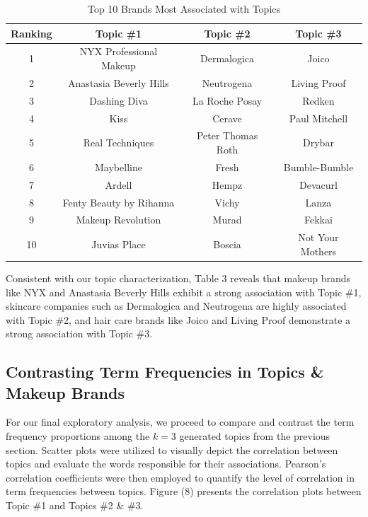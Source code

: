 \documentclass[10pt]{article}
\begin{document}
\begin{table}[h!]
    \centering
    \begin{tabular}{| c | c | c | c |} 
    \hline
    \textbf{Ranking} & \textbf{Topic \#1} & \textbf{Topic \#2} &  \textbf{Topic \#3}\\ 
    \hline
    \hline
     1  & NYX Professional Makeup & Dermalogica & Joico \\
     \hline  
     2  & Anastasia Beverly Hills & Neutrogena & Living Proof \\
     \hline  
     3  & Dashing Diva & La Roche Posay & Redken \\
     \hline  
     4  & Kiss & Cerave & Paul Mitchell \\
     \hline  
     5  & Real Techniques &	Peter Thomas Roth &	Drybar \\
     \hline  
     6  & Maybelline & Fresh & Bumble-Bumble \\ 
     \hline  
     7  & Ardell & Hempz & Devacurl \\
     \hline  
     8  & Fenty Beauty by Rihanna & Vichy & Lanza \\
     \hline  
     9  & Makeup Revolution & Murad & Fekkai \\
     \hline  
     10 & Juvias Place & Boscia & Not Your Mothers \\
    \hline  
    \end{tabular}
    \caption{Top 10 Brands Most Associated with Topics}
\end{table}

Consistent with our topic characterization, Table 3 reveals that makeup brands like NYX and Anastasia Beverly Hills exhibit a strong association with Topic \#1, skincare companies such as Dermalogica and Neutrogena are highly associated with Topic \#2, and hair care brands like Joico and Living Proof demonstrate a strong association with Topic \#3.


\subsection{Contrasting Term Frequencies in Topics \& Makeup Brands}

For our final exploratory analysis, we proceed to compare and contrast the term frequency proportions among the $k=3$ generated topics from the previous section. Scatter plots were utilized to visually depict the correlation between topics and evaluate the words responsible for their associations. Pearson's correlation coefficients were then employed to quantify the level of correlation in term frequencies between topics. Figure (8) presents the correlation plots between Topic \#1 and Topics \#2 \& \#3.
\end{document}
